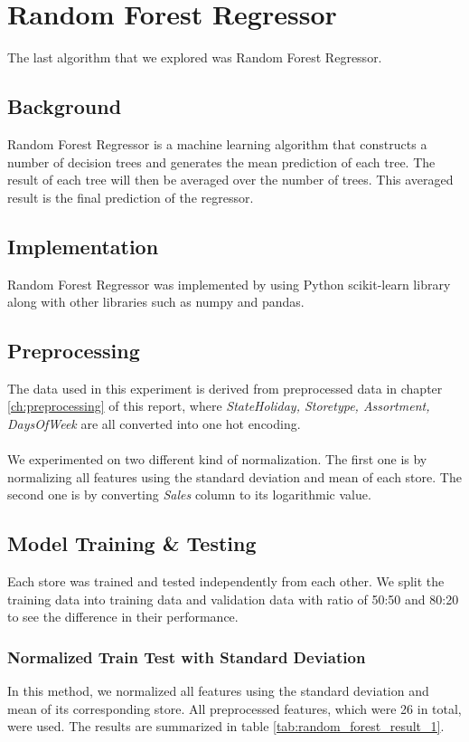 \section{Random Forest Regressor} \label{sec:rf}
The last algorithm that we explored was Random Forest Regressor.

\subsection{Background}
Random Forest Regressor is a machine learning algorithm that constructs a number of decision trees and generates the mean prediction of each tree. The result of each tree will then be averaged over the number of trees. This averaged result is the final prediction of the regressor. 

\subsection{Implementation}
Random Forest Regressor was implemented by using Python scikit-learn library along with other libraries such as numpy and pandas.

\subsection{Preprocessing}
The data used in this experiment is derived from preprocessed data in chapter \ref{ch:preprocessing} of this report, where \textit{StateHoliday, Storetype, Assortment, DaysOfWeek} are all converted into one hot encoding. \\ \\
We experimented on two different kind of normalization. The first one is by normalizing all features using the standard deviation and mean of each store. The second one is by converting \textit{Sales} column to its logarithmic value.  

\subsection{Model Training \& Testing}
Each store was trained and tested independently from each other. We split the training data into training data and validation data with ratio of 50:50 and 80:20 to see the difference in their performance. 

\subsubsection{Normalized Train Test with Standard Deviation}
In this method, we normalized all features using the standard deviation and mean of its corresponding store. All preprocessed features, which were 26 in total, were used. The results are summarized in table \ref{tab:random_forest_result_1}.

